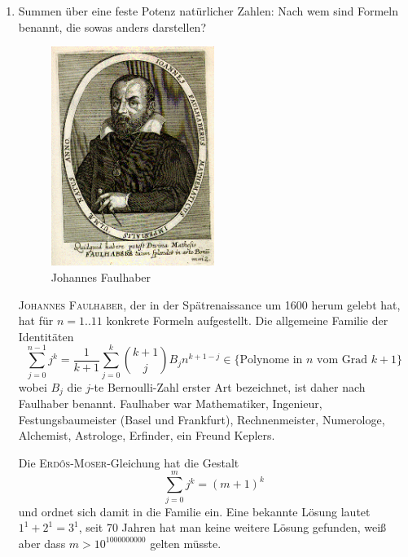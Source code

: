 \documentclass[a4paper,11pt,notitlepage,fullpage]{article}
\begin{document}
\begin{enumerate}
\begin{enumerate}
\item Summen über eine feste Potenz natürlicher Zahlen: Nach wem sind Formeln benannt, die sowas anders darstellen?

\begin{figure}[h!]
\centering
\includegraphics[width=0.5\textwidth]{gfx/Ioannes-Faulhaberus-Mathematicus-Imperialis-Ulmae-Natus.png}
\caption{Johannes Faulhaber}
\end{figure}

\textsc{Johannes Faulhaber}, der in der Spätrenaissance um 1600 herum gelebt hat, hat für $n=1..11$ konkrete Formeln aufgestellt.
Die allgemeine Familie der Identitäten
$$\sum_{j=0}^{n-1} j^k = \frac{1}{k+1}\sum_{j=0}^k \binom{k+1}{j} B_{j} n^{k+1-j} \in \text{\{Polynome in $n$ vom Grad $k+1$\}}$$
wobei $B_j$ die $j$-te Bernoulli-Zahl erster Art bezeichnet, ist daher nach Faulhaber benannt.
Faulhaber war Mathematiker, Ingenieur, Festungsbaumeister (Basel und Frankfurt), Rechnenmeister, Numerologe, Alchemist, Astrologe, Erfinder, ein Freund Keplers.


Die \textsc{Erdős}-\textsc{Moser}-Gleichung hat die Gestalt
$$\sum_{j=0}^{m} j^k = (m+1)^k$$
und ordnet sich damit in die Familie ein. Eine bekannte Lösung lautet $1^1+2^1=3^1$, seit 70 Jahren hat man keine weitere Lösung gefunden, weiß aber dass $m>10^{1000000000}$ gelten müsste.



\end{enumerate}
\end{enumerate}
\end{document}
